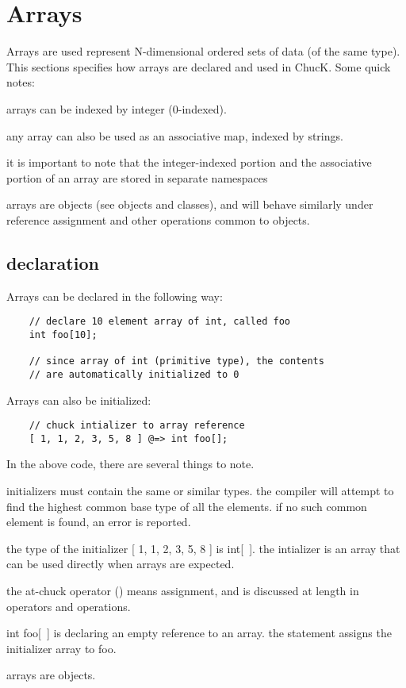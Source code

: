 \chapter{Arrays}

Arrays are used represent N-dimensional ordered sets of data (of the same type). This sections specifies how arrays are declared and used in ChucK. Some quick notes:
\begin{chuckitemize}
\item  arrays can be indexed by integer (0-indexed).
\item  any array can also be used as an associative map, indexed by strings.
\item  it is important to note that the integer-indexed portion and the associative portion of an array are stored in separate namespaces
\item  arrays are objects (see objects and classes), and will behave similarly under reference assignment and other operations common to objects.
\end{chuckitemize}

\section{declaration}

Arrays can be declared in the following way:
\begin{verbatim}
    // declare 10 element array of int, called foo
    int foo[10];

    // since array of int (primitive type), the contents
    // are automatically initialized to 0
\end{verbatim}

Arrays can also be initialized:
\begin{verbatim}
    // chuck intializer to array reference
    [ 1, 1, 2, 3, 5, 8 ] @=> int foo[];
\end{verbatim}

 In the above code, there are several things to note.
\begin{chuckitemize}
\item  initializers must contain the same or similar types. the compiler will attempt to find the highest common base type of all the elements. if no such common element is found, an error is reported.
\item  the type of the initializer [ 1, 1, 2, 3, 5, 8 ] is int[~]. the intializer is an array that can be used directly when arrays are expected.
\item  the at-chuck operator (\atchuckop) means assignment, and is discussed at length in operators and operations.
\item int foo[~] is declaring an empty reference to an array. the statement assigns the initializer array to foo.
\item  arrays are objects.
\end{chuckitemize}

